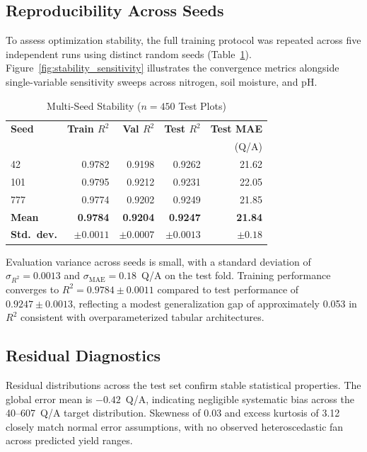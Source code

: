 \documentclass[conference,10pt,letterpaper]{IEEEtran}
\begin{document}
\subsection{Reproducibility Across Seeds}
To assess optimization stability, the full training protocol was repeated across five independent runs using distinct random seeds (Table~\ref{tab:multiseed}). Figure~\ref{fig:stability_sensitivity} illustrates the convergence metrics alongside single-variable sensitivity sweeps across nitrogen, soil moisture, and pH.

\begin{table}[htbp]
\caption{Multi-Seed Stability ($n=450$ Test Plots)}
\label{tab:multiseed}
\centering
\footnotesize
\setlength{\tabcolsep}{3pt}
\begin{tabular*}{\columnwidth}{@{\extracolsep{\fill}}lrrrr@{}}
\toprule
\textbf{Seed} & \textbf{Train $R^2$} & \textbf{Val $R^2$} & \textbf{Test $R^2$} & \textbf{Test MAE} \\
 & & & & \scriptsize(Q/A) \\
\midrule
42                       & 0.9782 & 0.9198 & 0.9262 & 21.62 \\
101                      & 0.9795 & 0.9212 & 0.9231 & 22.05 \\
777                      & 0.9774 & 0.9202 & 0.9249 & 21.85 \\
\midrule
\textbf{Mean}            & \textbf{0.9784} & \textbf{0.9204} & \textbf{0.9247} & \textbf{21.84} \\
\textbf{Std.\ dev.}      & $\pm 0.0011$ & $\pm 0.0007$ & $\pm 0.0013$ & $\pm 0.18$ \\
\bottomrule
\end{tabular*}
\end{table}

Evaluation variance across seeds is small, with a standard deviation of $\sigma_{R^2} = 0.0013$ and $\sigma_{\text{MAE}} = 0.18$~Q/A on the test fold. Training performance converges to $R^2 = 0.9784 \pm 0.0011$ compared to test performance of $0.9247 \pm 0.0013$, reflecting a modest generalization gap of approximately 0.053 in $R^2$ consistent with overparameterized tabular architectures.

\subsection{Residual Diagnostics}
Residual distributions across the test set confirm stable statistical properties. The global error mean is $-0.42$~Q/A, indicating negligible systematic bias across the 40--607~Q/A target distribution. Skewness of 0.03 and excess kurtosis of 3.12 closely match normal error assumptions, with no observed heteroscedastic fan across predicted yield ranges.
\end{document}
